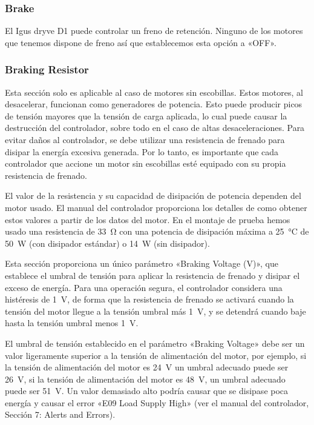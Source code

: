\documentclass[english,spanish,a4paper,11pt]{article}
\begin{document}
\subsubsection{Brake}

El Igus dryve D1 puede controlar un freno de retención. Ninguno de los motores que tenemos dispone de freno así que establecemos esta opción a «OFF».


\subsubsection{Braking Resistor}

Esta sección solo es aplicable al caso de motores sin escobillas. Estos motores, al desacelerar, funcionan como generadores de potencia. Esto puede producir picos de tensión mayores que la tensión de carga aplicada, lo cual puede causar la destrucción del controlador, sobre todo en el caso de altas desaceleraciones. Para evitar daños al controlador, se debe utilizar una resistencia de frenado para disipar la energía excesiva generada. Por lo tanto, es importante que cada controlador que accione un motor sin escobillas esté equipado con su propia resistencia de frenado.

El valor de la resistencia y su capacidad de disipación de potencia dependen del motor usado. El manual del controlador proporciona los detalles de como obtener estos valores a partir de los datos del motor. En el montaje de prueba hemos usado una resistencia de \qty{33}{\ohm} con una potencia de disipación máxima a \qty{25}{\degreeCelsius} de \qty{50}{\W} (con disipador estándar) o \qty{14}{\W} (sin disipador).

Esta sección proporciona un único parámetro «Braking Voltage (V)», que establece el umbral de tensión para aplicar la resistencia de frenado y disipar el exceso de energía. Para una operación segura, el controlador considera una histéresis de \qty{1}{\V}, de forma que la resistencia de frenado se activará cuando la tensión del motor llegue a la tensión umbral más \qty{1}{\V}, y se detendrá cuando baje hasta la tensión umbral menos \qty{1}{\V}.

El umbral de tensión establecido en el parámetro «Braking Voltage» debe ser un valor ligeramente superior a la tensión de alimentación del motor, por ejemplo, si la tensión de alimentación del motor es \qty{24}{\V} un umbral adecuado puede ser \qty{26}{\V}, si la tensión de alimentación del motor es \qty{48}{\V}, un umbral adecuado puede ser \qty{51}{\V}. Un valor demasiado alto podría causar que se disipase poca energía y causar el error «E09 Load Supply High» (ver el manual del controlador, Sección 7: Alerts and Errors).
\end{document}
